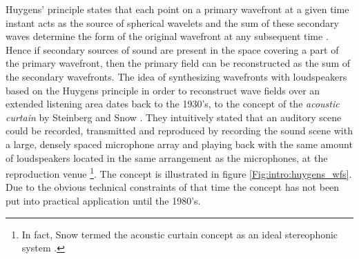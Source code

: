 Huygens' principle states that each point on a primary wavefront at a given time instant acts as the source of spherical wavelets and the sum of these secondary waves determine the form of the original wavefront at any subsequent time \cite{Huygens1690}.
Hence if secondary sources of sound are present in the space covering a part of the primary wavefront, then the primary field can be reconstructed as the sum of the secondary wavefronts.
The idea of synthesizing wavefronts with loudspeakers based on the Huygens principle in order to reconstruct wave fields over an extended listening area dates back to the 1930's, to the concept of the \emph{acoustic curtain} by Steinberg and Snow \cite{Steinberg1934}.
They intuitively stated that an auditory scene could be recorded, transmitted and reproduced by recording the sound scene with a large, densely spaced microphone array and playing back with the same amount of loudspeakers located in the same arrangement as the microphones, at the reproduction venue \footnote{In fact, Snow termed the acoustic curtain concept as an ideal stereophonic system \cite{7254953}.}.
The concept is illustrated in figure \ref{Fig:intro:huygens_wfs}.
Due to the obvious technical constraints of that time the concept has not been put into practical application until the 1980's.

